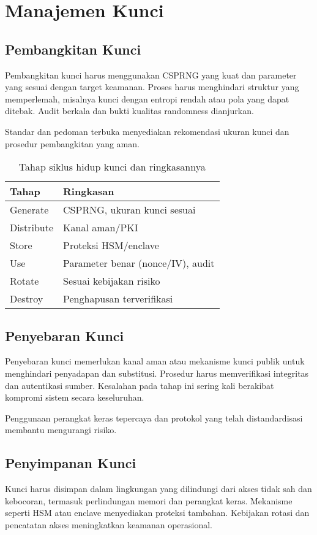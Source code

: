 \documentclass[../main.tex]{subfiles}
\begin{document}
\chapter{Manajemen Kunci}

\section{Pembangkitan Kunci}
Pembangkitan kunci harus menggunakan CSPRNG yang kuat dan parameter yang sesuai dengan target keamanan. Proses harus menghindari struktur yang memperlemah, misalnya kunci dengan entropi rendah atau pola yang dapat ditebak. Audit berkala dan bukti kualitas randomness dianjurkan.

Standar dan pedoman terbuka menyediakan rekomendasi ukuran kunci dan prosedur pembangkitan yang aman.

\begin{table}[h]
\centering
\caption{Tahap siklus hidup kunci dan ringkasannya}
\label{tab:key-lifecycle}
\begin{tabular}{ll}
\toprule
Tahap & Ringkasan \\
\midrule
Generate & CSPRNG, ukuran kunci sesuai \parencite{nist800133,nist80057p1} \\
Distribute & Kanal aman/PKI \parencite{rfc5280} \\
Store & Proteksi HSM/enclave \\
Use & Parameter benar (nonce/IV), audit \\
Rotate & Sesuai kebijakan risiko \parencite{nist80057p1} \\
Destroy & Penghapusan terverifikasi \\
\bottomrule
\end{tabular}
\end{table}

\section{Penyebaran Kunci}
Penyebaran kunci memerlukan kanal aman atau mekanisme kunci publik untuk menghindari penyadapan dan substitusi. Prosedur harus memverifikasi integritas dan autentikasi sumber. Kesalahan pada tahap ini sering kali berakibat kompromi sistem secara keseluruhan.

Penggunaan perangkat keras tepercaya dan protokol yang telah distandardisasi membantu mengurangi risiko.

\section{Penyimpanan Kunci}
Kunci harus disimpan dalam lingkungan yang dilindungi dari akses tidak sah dan kebocoran, termasuk perlindungan memori dan perangkat keras. Mekanisme seperti HSM atau enclave menyediakan proteksi tambahan. Kebijakan rotasi dan pencatatan akses meningkatkan keamanan operasional.
\end{document}
